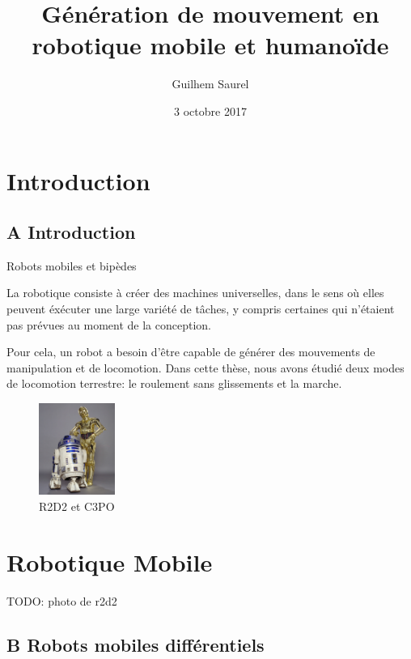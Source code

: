 \documentclass[french,ignorenonframetext,]{beamer}
\title[]{Génération de mouvement en robotique mobile et humanoïde}
\author{Guilhem Saurel}
\institute{Gepetto - LAAS-CNRS}
\date{3 octobre 2017}
\begin{document}
\frame{\titlepage}

\begin{frame}
\tableofcontents
\end{frame}

\section{Introduction}\label{introduction}

\subsection{A Introduction}\label{a-introduction}

\begin{frame}{Robots mobiles et bipèdes}

La robotique consiste à créer des machines universelles, dans le sens où
elles peuvent éxécuter une large variété de tâches, y compris certaines
qui n'étaient pas prévues au moment de la conception.

Pour cela, un robot a besoin d'être capable de générer des mouvements de
manipulation et de locomotion. Dans cette thèse, nous avons étudié deux
modes de locomotion terrestre: le roulement sans glissements et la
marche.

\begin{figure}
\centering
\includegraphics[height=3.00000cm]{imgs/starwars.jpg}
\caption{R2D2 et C3PO}
\end{figure}

\end{frame}

\section{Robotique Mobile}\label{robotique-mobile}

TODO: photo de r2d2

\subsection{B Robots mobiles
différentiels}\label{b-robots-mobiles-diffuxe9rentiels}
\end{document}
